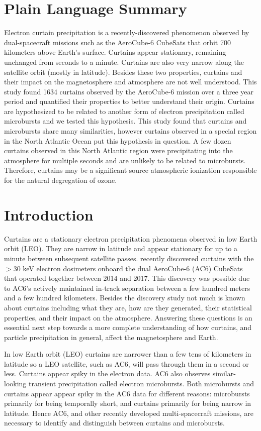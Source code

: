 \documentclass[draft]{agujournal2019}
\begin{document}
\section{Plain Language Summary}
Electron curtain precipitation is a recently-discovered phenomenon observed by dual-spacecraft missions such as the AeroCube-6 CubeSats that orbit 700 kilometers above Earth's surface. Curtains appear stationary, remaining unchanged from seconds to a minute. Curtains are also very narrow along the satellite orbit (mostly in latitude). Besides these two properties, curtains and their impact on the magnetosphere and atmosphere are not well understood. This study found 1634 curtains observed by the AeroCube-6 mission over a three year period and quantified their properties to better understand their origin. Curtains are hypothesized to be related to another form of electron precipitation called microbursts and we tested this hypothesis. This study found that curtains and microbursts share many similarities, however curtains observed in a special region in the North Atlantic Ocean put this hypothesis in question. A few dozen curtains observed in this North Atlantic region were precipitating into the atmosphere for multiple seconds and are unlikely to be related to microbursts. Therefore, curtains may be a significant source atmospheric ionization responsible for the natural degregation of ozone.

\section{Introduction}
Curtains are a stationary electron precipitation phenomena observed in low Earth orbit (LEO). They are narrow in latitude and appear stationary for up to a minute between subsequent satellite passes.  recently discovered curtains with the $> 30$ keV electron dosimeters onboard the dual AeroCube-6 (AC6) CubeSats that operated together between 2014 and 2017. This discovery was possible due to AC6's actively maintained in-track separation between a few hundred meters and a few hundred kilometers. Besides the  discovery study not much is known about curtains including what they are, how are they generated, their statistical properties, and their impact on the atmosphere. Answering these questions is an essential next step towards a more complete understanding of how curtains, and particle precipitation in general, affect the magnetosphere and Earth.

In low Earth orbit (LEO) curtains are narrower than a few tens of kilometers in latitude so a LEO satellite, such as AC6, will pass through them in a second or less. Curtains appear spiky in the electron data. AC6 also observes similar-looking transient precipitation called electron microbursts. Both microbursts and curtains appear appear spiky in the AC6 data for different reasons: microbursts primarily for being temporally short, and curtains primarily for being narrow in latitude. Hence AC6, and other recently developed multi-spacecraft missions, are necessary to identify and distinguish between curtains and microbursts.
\end{document}
